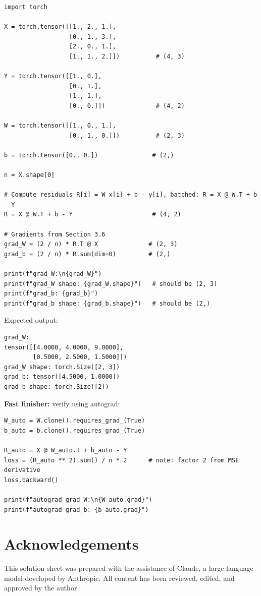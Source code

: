 \documentclass[12pt, a4paper]{scrartcl}
\begin{document}
\begin{verbatim}
import torch

X = torch.tensor([[1., 2., 1.],
                  [0., 1., 3.],
                  [2., 0., 1.],
                  [1., 1., 2.]])          # (4, 3)

Y = torch.tensor([[1., 0.],
                  [0., 1.],
                  [1., 1.],
                  [0., 0.]])              # (4, 2)

W = torch.tensor([[1., 0., 1.],
                  [0., 1., 0.]])          # (2, 3)

b = torch.tensor([0., 0.])               # (2,)

n = X.shape[0]

# Compute residuals R[i] = W x[i] + b - y[i], batched: R = X @ W.T + b - Y
R = X @ W.T + b - Y                      # (4, 2)

# Gradients from Section 3.6
grad_W = (2 / n) * R.T @ X              # (2, 3)
grad_b = (2 / n) * R.sum(dim=0)         # (2,)

print(f"grad_W:\n{grad_W}")
print(f"grad_W shape: {grad_W.shape}")   # should be (2, 3)
print(f"grad_b: {grad_b}")
print(f"grad_b shape: {grad_b.shape}")   # should be (2,)
\end{verbatim}

Expected output:
\begin{verbatim}
grad_W:
tensor([[4.0000, 4.0000, 9.0000],
        [0.5000, 2.5000, 1.5000]])
grad_W shape: torch.Size([2, 3])
grad_b: tensor([4.5000, 1.0000])
grad_b shape: torch.Size([2])
\end{verbatim}

\textbf{Fast finisher:} verify using autograd:
\begin{verbatim}
W_auto = W.clone().requires_grad_(True)
b_auto = b.clone().requires_grad_(True)

R_auto = X @ W_auto.T + b_auto - Y
loss = (R_auto ** 2).sum() / n * 2      # note: factor 2 from MSE derivative
loss.backward()

print(f"autograd grad_W:\n{W_auto.grad}")
print(f"autograd grad_b: {b_auto.grad}")
\end{verbatim}

\section*{Acknowledgements}
This solution sheet was prepared with the assistance of Claude, a large
language model developed by Anthropic. All content has been reviewed, edited,
and approved by the author.
\end{document}
